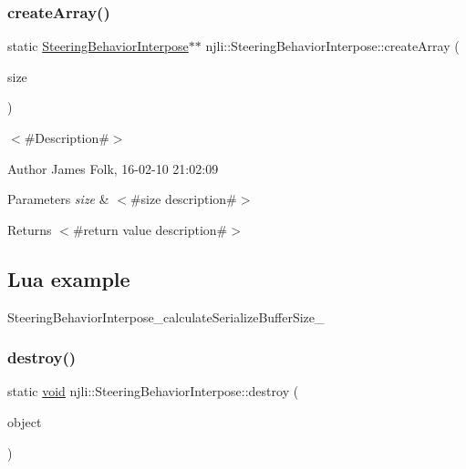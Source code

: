 \subsubsection{\texorpdfstring{create\+Array()}{createArray()}}
{\footnotesize\ttfamily static \mbox{\hyperlink{classnjli_1_1_steering_behavior_interpose}{Steering\+Behavior\+Interpose}}$\ast$$\ast$ njli\+::\+Steering\+Behavior\+Interpose\+::create\+Array (\begin{DoxyParamCaption}\item[{const \mbox{\hyperlink{_util_8h_a10e94b422ef0c20dcdec20d31a1f5049}{u32}}}]{size }\end{DoxyParamCaption})\hspace{0.3cm}{\ttfamily [static]}}



$<$\#\+Description\#$>$ 

\begin{DoxyAuthor}{Author}
James Folk, 16-\/02-\/10 21\+:02\+:09
\end{DoxyAuthor}

\begin{DoxyParams}{Parameters}
{\em size} & $<$\#size description\#$>$\\
\hline
\end{DoxyParams}
\begin{DoxyReturn}{Returns}
$<$\#return value description\#$>$
\end{DoxyReturn}
\hypertarget{classnjli_1_1_steering_behavior_wander_ex1}{}\subsection{Lua example}\label{classnjli_1_1_steering_behavior_wander_ex1}

\begin{DoxyCodeInclude}
\end{DoxyCodeInclude}
Steering\+Behavior\+Interpose\+\_\+calculate\+Serialize\+Buffer\+Size\+\_\+ \mbox{\label{classnjli_1_1_steering_behavior_interpose_ad15b4e28b4593217f193a84ae32168bd}} 
\subsubsection{\texorpdfstring{destroy()}{destroy()}}
{\footnotesize\ttfamily static \mbox{\hyperlink{_thread_8h_af1e856da2e658414cb2456cb6f7ebc66}{void}} njli\+::\+Steering\+Behavior\+Interpose\+::destroy (\begin{DoxyParamCaption}\item[{\mbox{\hyperlink{classnjli_1_1_steering_behavior_interpose}{Steering\+Behavior\+Interpose}} $\ast$}]{object }\end{DoxyParamCaption})\hspace{0.3cm}{\ttfamily [static]}}




